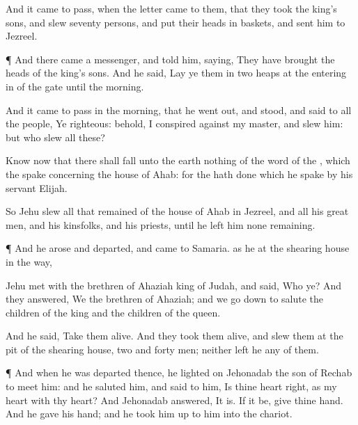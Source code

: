 {And it came to pass, when the
letter
came to them, that they
took the
king’s
sons, and
slew
seventy
persons, and
put their
heads in
baskets, and
sent him
{} to
Jezreel.


\par }{\PP {}¶ And there
came a
messenger, and
told him,
saying, They have
brought the
heads of the
king’s
sons. And he
said,
Lay ye them in
two
heaps at the entering
in of the
gate until the
morning.

And it came to pass in the
morning, that he went
out, and
stood, and
said to all the
people, Ye
{}
righteous: behold, I
conspired against my
master, and
slew him: but who
slew all these?

Know
now that there shall
fall unto the
earth nothing of the
word of the
{}, which the
{}
spake concerning the
house of
Ahab: for the
{} hath
done
{} which he
spake
by his
servant
Elijah.

So
Jehu
slew all that
remained of the
house of
Ahab in
Jezreel, and all his great
men, and his
kinsfolks, and his
priests, until he
left him none
remaining.


\par }{\PP {}¶ And he
arose and
departed, and
came to
Samaria.
{} as he
{} at the
shearing
house in the
way,

Jehu
met with the
brethren of
Ahaziah
king of
Judah, and
said, Who
{} ye? And they
answered, We
{} the
brethren of
Ahaziah; and we go
down to
salute the
children of the
king and the
children of the
queen.

And he
said,
Take them
alive. And they
took them
alive, and
slew them at the
pit of the shearing
house,
{}
two and
forty
men; neither
left he
any of them.


\par }{\PP {}¶ And when he was
departed thence, he
lighted on
Jehonadab the
son of
Rechab
{} to
meet him: and he
saluted him, and
said to him,
Is thine
heart
right, as my
heart
{} with thy
heart? And
Jehonadab
answered, It
is. If it be,
give
{} thine
hand. And he
gave
{} his
hand; and he took him
up to him into the
chariot.

}
